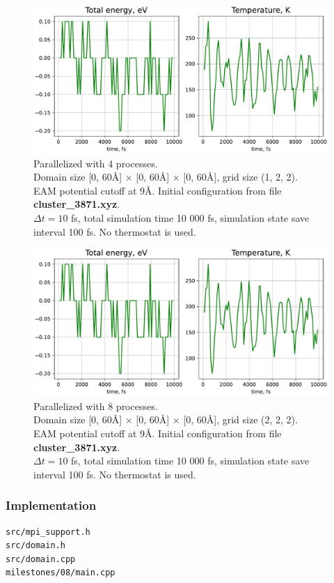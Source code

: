 \documentclass[12pt,a4paper]{article}
\begin{document}
\begin{figure}[h!]
	\centering
	\includegraphics[width=.85\linewidth]{img/milestone08-4proc.pdf}
	\caption{Parallelized with 4 processes.\\
	Domain size [0, 60Å] $\times$ [0, 60Å] $\times$ [0, 60Å], grid size (1, 2, 2).\\
	EAM potential cutoff at 9Å. Initial configuration from file {\bf cluster\_3871.xyz}.\\
	$\Delta t = 10$ fs, total simulation time 10 000 fs, simulation state save interval 100 fs. No thermostat is used.}
	\label{fig:parallel-2}
\end{figure}

\clearpage

\begin{figure}[h!]
	\centering
	\includegraphics[width=.85\linewidth]{img/milestone08-8proc.pdf}
	\caption{Parallelized with 8 processes.\\
	Domain size [0, 60Å] $\times$ [0, 60Å] $\times$ [0, 60Å], grid size (2, 2, 2).\\
	EAM potential cutoff at 9Å. Initial configuration from file {\bf cluster\_3871.xyz}.\\
	$\Delta t = 10$ fs, total simulation time 10 000 fs, simulation state save interval 100 fs. No thermostat is used.}
	\label{fig:parallel-3}
\end{figure}


\subsubsection*{Implementation}
\begin{lstlisting}[breaklines]
src/mpi_support.h
src/domain.h
src/domain.cpp
milestones/08/main.cpp
\end{lstlisting}
\end{document}
